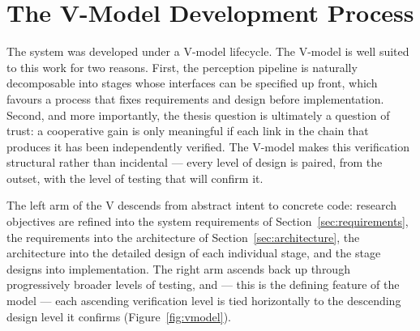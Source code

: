 \section{The V-Model Development Process}
\label{sec:vmodel}

The system was developed under a V-model lifecycle. The V-model is well
suited to this work for two reasons. First, the perception pipeline is naturally
decomposable into stages whose interfaces can be specified up front, which favours
a process that fixes requirements and design before implementation. Second, and
more importantly, the thesis question is ultimately a question of trust: a
cooperative gain is only meaningful if each link in the chain that produces it has
been independently verified. The V-model makes this verification structural rather
than incidental --- every level of design is paired, from the outset, with the
level of testing that will confirm it.

The left arm of the V descends from abstract intent to concrete code: research
objectives are refined into the system requirements of Section~\ref{sec:requirements},
the requirements into the architecture of Section~\ref{sec:architecture}, the
architecture into the detailed design of each individual stage, and the stage
designs into implementation. The right arm ascends back up through progressively
broader levels of testing, and --- this is the defining feature of the model ---
each ascending verification level is tied horizontally to the descending design
level it confirms (Figure~\ref{fig:vmodel}).

